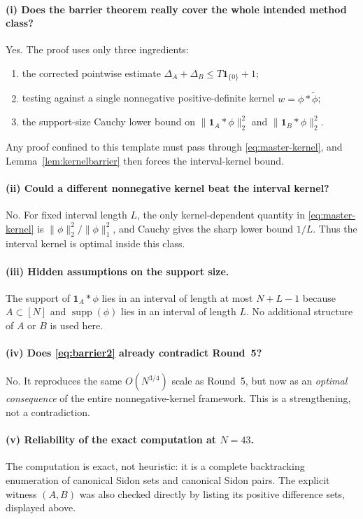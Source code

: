 \paragraph{(i) Does the barrier theorem really cover the whole intended method class?}
Yes.  The proof uses only three ingredients:
\begin{enumerate}
\item the corrected pointwise estimate $\Delta_A+\Delta_B\le T\mathbf 1_{\{0\}}+1$;
\item testing against a single nonnegative positive-definite kernel $w=\phi*\widetilde\phi$;
\item the support-size Cauchy lower bound on $\|\mathbf 1_A*\phi\|_2^2$ and $\|\mathbf 1_B*\phi\|_2^2$.
\end{enumerate}
Any proof confined to this template must pass through \eqref{eq:master-kernel}, and Lemma~\ref{lem:kernelbarrier} then forces the interval-kernel bound.

\paragraph{(ii) Could a different nonnegative kernel beat the interval kernel?}
No.  For fixed interval length $L$, the only kernel-dependent quantity in \eqref{eq:master-kernel} is $\|\phi\|_2^2/\|\phi\|_1^2$, and Cauchy gives the sharp lower bound $1/L$.  Thus the interval kernel is optimal inside this class.

\paragraph{(iii) Hidden assumptions on the support size.}
The support of $\mathbf 1_A*\phi$ lies in an interval of length at most $N+L-1$ because $A\subset[N]$ and $\operatorname{supp}(\phi)$ lies in an interval of length $L$.  No additional structure of $A$ or $B$ is used here.

\paragraph{(iv) Does \eqref{eq:barrier2} already contradict Round~5?}
No.  It reproduces the same $O(N^{3/4})$ scale as Round~5, but now as an \emph{optimal consequence} of the entire nonnegative-kernel framework.  This is a strengthening, not a contradiction.

\paragraph{(v) Reliability of the exact computation at \texorpdfstring{$N=43$}{N=43}.}
The computation is exact, not heuristic: it is a complete backtracking enumeration of canonical Sidon sets and canonical Sidon pairs.  The explicit witness $(A,B)$ was also checked directly by listing its positive difference sets, displayed above.

